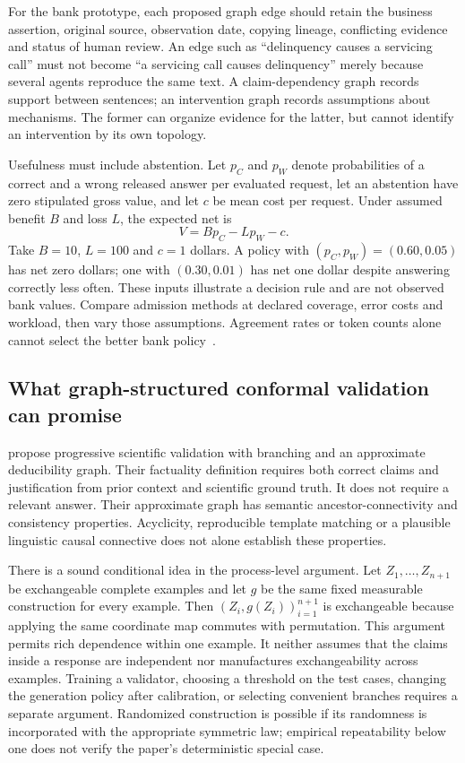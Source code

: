 For the bank prototype, each proposed graph edge should retain the business
assertion, original source, observation date, copying lineage, conflicting
evidence and status of human review. An edge such as ``delinquency causes a
servicing call'' must not become ``a servicing call causes delinquency'' merely
because several agents reproduce the same text. A claim-dependency graph
records support between sentences; an intervention graph records assumptions
about mechanisms. The former can organize evidence for the latter, but cannot
identify an intervention by its own topology.

Usefulness must include abstention. Let $p_C$ and $p_W$ denote probabilities
of a correct and a wrong released answer per evaluated request, let an
abstention have zero stipulated gross value, and let $c$ be mean cost per
request. Under assumed benefit $B$ and loss $L$, the expected net is
\begin{equation}
 V=Bp_C-Lp_W-c.
 \label{exec23:admit-value}
\end{equation}
Take $B=10$, $L=100$ and $c=1$ dollars. A policy with
$(p_C,p_W)=(0.60,0.05)$ has net zero dollars; one with
$(0.30,0.01)$ has net one dollar despite answering correctly less often.
These inputs illustrate a decision rule and are not observed bank values.
Compare admission methods at declared coverage, error costs and workload,
then vary those assumptions. Agreement rates or token counts alone cannot
select the better bank policy~\citep{exec23_admission_conformal_reference}.

\subsection{What graph-structured conformal validation can promise}
\label{exec23:admit-conformal}
\citet{exec23_scientific_conformal} propose progressive scientific validation
with branching and an approximate deducibility graph. Their factuality
definition requires both correct claims and justification from prior context
and scientific ground truth. It does not require a relevant answer. Their
approximate graph has semantic ancestor-connectivity and consistency
properties. Acyclicity, reproducible template matching or a plausible
linguistic causal connective does not alone establish these properties.

There is a sound conditional idea in the process-level argument. Let
$Z_1,\ldots,Z_{n+1}$ be exchangeable complete examples and let $g$ be the same
fixed measurable construction for every example. Then
$(Z_i,g(Z_i))_{i=1}^{n+1}$ is exchangeable because applying the same coordinate
map commutes with permutation. This argument permits rich dependence within
one example. It neither assumes that the claims inside a response are
independent nor manufactures exchangeability across examples. Training a
validator, choosing a threshold on the test cases, changing the generation
policy after calibration, or selecting convenient branches requires a
separate argument. Randomized construction is possible if its randomness is
incorporated with the appropriate symmetric law; empirical repeatability
below one does not verify the paper's deterministic special case.

